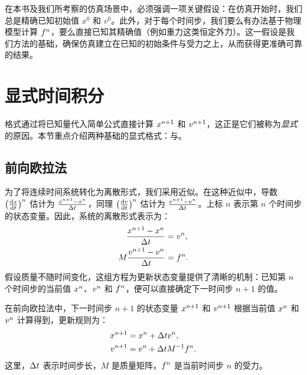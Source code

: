 在本书及我们所考察的仿真场景中，必须强调一项关键假设：在仿真开始时，我们总是精确已知初始值 $x^0$ 和 $v^0$。此外，对于每个时间步，我们要么有办法基于物理模型计算 $f^{n}$，要么直接已知其精确值（例如重力这类恒定外力）。这一假设是我们方法的基础，确保仿真建立在已知的初始条件与受力之上，从而获得更准确可靠的结果。

\section{显式时间积分}
\label{sec:explicit-time-integration}

格式通过将已知量代入简单公式直接计算 $x^{n+1}$ 和 $v^{n+1}$，这正是它们被称为\emph{显式}的原因。本节重点介绍两种基础的显式格式：与。

\subsection{前向欧拉法}
\label{subsec:forward-euler}

为了将连续时间系统转化为离散形式，我们采用近似。在这种近似中，导数 $\bigl(\frac{\mathrm{d} x}{\mathrm{d} t}\bigr)^n$ 估计为 $\frac{x^{n+1} - x^{n}}{\Delta t}$，同理 $\bigl(\frac{\mathrm{d} v}{\mathrm{d} t}\bigr)^n$ 估计为 $\frac{v^{n+1} - v^{n}}{\Delta t}$。上标 $n$ 表示第 $n$ 个时间步的状态变量。因此，系统的离散形式表示为：
\begin{equation}
  \label{eq:lec1:governing_discSpace_discTime}
  \begin{aligned}
    \frac{x^{n+1} - x^{n}}{\Delta t} &= v^{n}, \\
    M\frac{v^{n+1} - v^{n}}{\Delta t} &= f^{n}.
  \end{aligned}
\end{equation}
假设质量不随时间变化，这组方程为更新状态变量提供了清晰的机制：已知第 $n$ 个时间步的当前值 $x^{n}$、$v^{n}$ 和 $f^{n}$，便可以直接确定下一时间步 $n+1$ 的值。

\begin{method}[牛顿第二定律的前向欧拉时间积分]
  \label{met:lec1:forward_euler}
  在前向欧拉法中，下一时间步 $n+1$ 的状态变量 $x^{n+1}$ 和 $v^{n+1}$ 根据当前值 $x^{n}$ 和 $v^{n}$ 计算得到，更新规则为：
  \begin{equation}
    \label{eq:lec1:updateRule_explicit}
    \begin{aligned}
      x^{n+1} &= x^{n} + \Delta t v^{n}, \\
      v^{n+1} &= v^{n} + \Delta t M^{-1} f^{n}.
    \end{aligned}
  \end{equation}
  这里，$\Delta t$ 表示时间步长，$M$ 是质量矩阵，$f^{n}$ 是当前时间步 $n$ 的受力。
\end{method}

